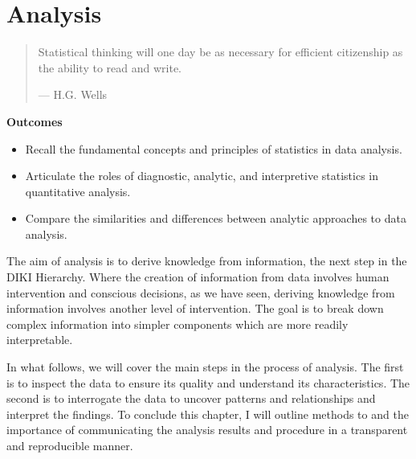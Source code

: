 \documentclass[
  letterpaper,
  DIV=11,
  numbers=noendperiod]{scrreprt}
\providecommand{\tightlist}{%
  \setlength{\itemsep}{0pt}\setlength{\parskip}{0pt}}\usepackage{longtable,booktabs,array}
\theoremstyle{definition}
\theoremstyle{remark}
\begin{document}
\chapter{Analysis}\label{sec-approaching-analysis}

\begin{quote}
Statistical thinking will one day be as necessary for efficient
citizenship as the ability to read and write.

--- H.G. Wells
\end{quote}

\begin{tcolorbox}[enhanced jigsaw, leftrule=.75mm, colframe=quarto-callout-color-frame, colback=white, rightrule=.15mm, opacityback=0, arc=.35mm, breakable, bottomrule=.15mm, left=2mm, toprule=.15mm]

\textbf{ Outcomes}

\begin{itemize}
\tightlist
\item
  Recall the fundamental concepts and principles of statistics in data
  analysis.
\item
  Articulate the roles of diagnostic, analytic, and interpretive
  statistics in quantitative analysis.
\item
  Compare the similarities and differences between analytic approaches
  to data analysis.
\end{itemize}

\end{tcolorbox}

The aim of analysis is to derive knowledge from information, the next
step in the DIKI Hierarchy. Where the creation of information from data
involves human intervention and conscious decisions, as we have seen,
deriving knowledge from information involves another level of
intervention. The goal is to break down complex information into simpler
components which are more readily interpretable.

In what follows, we will cover the main steps in the process of
analysis. The first is to inspect the data to ensure its quality and
understand its characteristics. The second is to interrogate the data to
uncover patterns and relationships and interpret the findings. To
conclude this chapter, I will outline methods to and the importance of
communicating the analysis results and procedure in a transparent and
reproducible manner.
\end{document}
